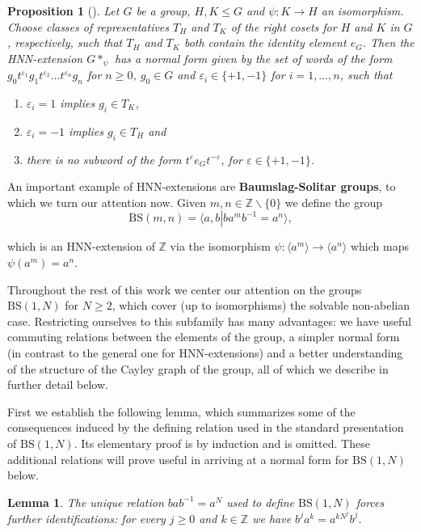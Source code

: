 \documentclass{aims}
\newcommand{\BS}[1][N]{\mathrm{BS}(1,#1)}
\newtheorem{lemma}[theorem]{Lemma}
\newtheorem{proposition}{Proposition}
\theoremstyle{definition}
\begin{document}
\begin{proposition}[{\cite[Theorem~IV.2.1]{lyndon_schupp_1977}}] \label{prop:hnn_general_normal_form}Let $G$ be a group, $H,K\le G$ and $\psi:K\to H$ an isomorphism. 
	Choose classes of representatives $T_H$ and $T_K$ of the right cosets for $H$ and $K$ in $G$, respectively, such that $T_H$ and $T_K$ both contain the identity element $e_G$. Then the HNN-extension $G*_\psi$ has a normal form given by the set of words of the form $g_0t^{\varepsilon_1}g_1t^{\varepsilon_2}\ldots t^{\varepsilon_n}g_n$ for $n\ge 0$, $g_0\in G$ and $\varepsilon_i\in \{+1,-1\}$ for $i=1,\ldots,n$, such that
	\begin{enumerate}
		\item $\varepsilon_i=1 $ implies $g_i\in T_K$,
		\item $\varepsilon_i=-1$ implies $g_i\in T_H$ and 
		\item there is no subword of the form $t^\varepsilon e_G t^{-\varepsilon}$, for $\varepsilon\in\{+1,-1\}$.
	\end{enumerate} 
\end{proposition}

An important example of HNN-extensions are \textbf{Baumslag-Solitar groups}, to which we turn our attention now. Given $m,n\in \mathbb{Z}\backslash\{0\}$ we define the group 
$$\mathrm{BS}(m,n)=\langle a,b \left|\right. ba^mb^{-1}=a^n\rangle,$$ 

which is an HNN-extension of $\mathbb{Z}$ via the isomorphism $\psi:\langle a^m \rangle\to \langle a^n\rangle$ which maps $\psi(a^m)=a^n$.

Throughout the rest of this work we center our attention on the groups $\mathrm{BS}(1,N)$ for $N\ge 2$, which cover (up to isomorphisms) the solvable non-abelian case. Restricting ourselves to this subfamily has many advantages: we have useful commuting relations between the elements of the group, a simpler normal form (in contrast to the general one for HNN-extensions) and a better understanding of the structure of the Cayley graph of the group, all of which we describe in further detail below.

First we establish the following lemma, which summarizes some of the consequences induced by the defining relation used in the standard presentation of $\BS$. Its elementary proof is by induction and is omitted. These additional relations will prove useful in arriving at a normal form for $\BS$ below.

\begin{lemma}\label{prop:bs_further_identifications} The unique relation $bab^{-1}=a^N$ used to define $\BS$ forces further identifications: for every $j\ge 0$ and $k\in \mathbb{Z}$ we have $b^{j}a^k=a^{kN^j}b^j$.
\end{lemma}
\end{document}

